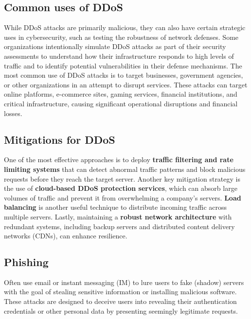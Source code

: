 \subsection{Common uses of DDoS}
While DDoS attacks are primarily malicious, they can also have certain strategic uses in cybersecurity, such as testing the robustness of network defenses. Some organizations intentionally simulate DDoS attacks as part of their security assessments to understand how their infrastructure responds to high levels of traffic and to identify potential vulnerabilities in their defense mechanisms.
The most common use of DDoS attacks is to target businesses, government agencies, or other organizations in an attempt to disrupt services. These attacks can target online platforms, e-commerce sites, gaming services, financial institutions, and critical infrastructure, causing significant operational disruptions and financial losses.

\subsection{Mitigations for DDoS}
One of the most effective approaches is to deploy \textbf{traffic filtering and rate limiting systems} that can detect abnormal traffic patterns and block malicious requests before they reach the target server. Another key mitigation strategy is the use of \textbf{cloud-based DDoS protection services}, which can absorb large volumes of traffic and prevent it from overwhelming a company’s servers. \textbf{Load balancing} is another useful technique to distribute incoming traffic across multiple servers. Lastly, maintaining a \textbf{robust network architecture} with redundant systems, including backup servers and distributed content delivery networks (CDNs), can enhance resilience.



\begin{center}
    \section{Phishing}
\end{center}
Often use email or instant messaging (IM) to lure users to fake (shadow) servers with the goal of stealing sensitive information or installing malicious software. These attacks are designed to deceive users into revealing their authentication credentials or other personal data by presenting seemingly legitimate requests.

